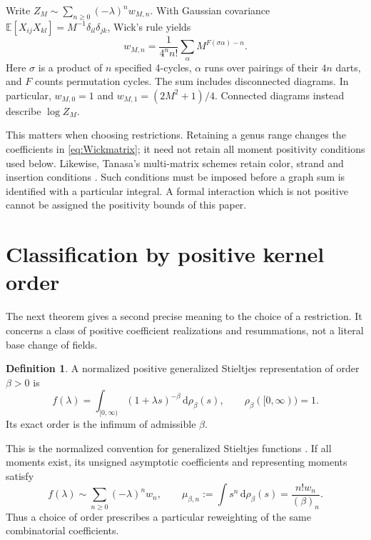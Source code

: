\documentclass[11pt]{article}
\theoremstyle{definition}
\newtheorem{definition}[theorem]{Definition}
\newcommand{\E}{\mathbb E}
\newcommand{\dd}{\,\mathrm d}
\numberwithin{equation}{section}
\begin{document}
Write $Z_M\sim\sum_{n\ge0}(-\lambda)^n w_{M,n}$.
With Gaussian covariance
$\E[X_{ij}X_{kl}]=M^{-1}\delta_{il}\delta_{jk}$, Wick's rule yields
\begin{equation}\label{eq:Wickmatrix}
 w_{M,n}=\frac1{4^n n!}\sum_{\alpha}M^{F(\sigma\alpha)-n}.
\end{equation}
Here $\sigma$ is a product of $n$ specified 4-cycles, $\alpha$ runs over
pairings of their $4n$ darts, and $F$ counts permutation cycles. The sum
includes disconnected diagrams. In particular,
$w_{M,0}=1$ and $w_{M,1}=(2M^2+1)/4$.
Connected diagrams instead describe $\log Z_M$.

This matters when choosing restrictions. Retaining a genus range changes
the coefficients in \eqref{eq:Wickmatrix}; it need not retain all moment
positivity conditions used below. Likewise, Tanasa's multi-matrix
schemes retain color, strand and insertion conditions
\cite{Tanasa,BNT}. Such conditions must be imposed before a graph sum
is identified with a particular integral. A formal interaction which
is not positive cannot be assigned the positivity bounds of this paper.

\section{Classification by positive kernel order}\label{sec:positive}
The next theorem gives a second precise meaning to the choice of a
restriction. It concerns a class of positive coefficient realizations
and resummations, not a literal base change of fields.

\begin{definition}
A normalized positive generalized Stieltjes representation of order
$\beta>0$ is
\begin{equation}\label{eq:Sbeta}
 f(\lambda)=\int_{[0,\infty)}(1+\lambda s)^{-\beta}\dd\rho_\beta(s),
 \qquad\rho_\beta([0,\infty))=1.
\end{equation}
Its exact order is the infimum of admissible $\beta$.
\end{definition}
This is the normalized convention for generalized Stieltjes functions
\cite{Sokal,KarpPrilepkina,KarpHypergeometric}. If all moments exist, its unsigned
asymptotic coefficients and representing moments satisfy
\begin{equation}\label{eq:reweight}
 f(\lambda)\sim\sum_{n\ge0}(-\lambda)^n w_n,
 \qquad \mu_{\beta,n}:=\int s^n\dd\rho_\beta(s)
                  =\frac{n!w_n}{(\beta)_n}.
\end{equation}
Thus a choice of order prescribes a particular reweighting of the
same combinatorial coefficients.
\end{document}
